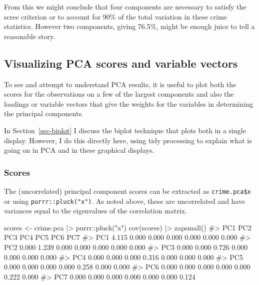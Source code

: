 \documentclass[
  letterpaper,
  10pt,
  krantz2]{krantz}
\makeatletter
\newenvironment{Shaded}{\begin{snugshade}}{\end{snugshade}}
\newcommand{\CommentTok}[1]{\textcolor[rgb]{0.37,0.37,0.37}{#1}}
\newcommand{\FunctionTok}[1]{\textcolor[rgb]{0.28,0.35,0.67}{#1}}
\newcommand{\NormalTok}[1]{\textcolor[rgb]{0.00,0.23,0.31}{#1}}
\newcommand{\OtherTok}[1]{\textcolor[rgb]{0.00,0.23,0.31}{#1}}
\newcommand{\SpecialCharTok}[1]{\textcolor[rgb]{0.37,0.37,0.37}{#1}}
\newcommand{\StringTok}[1]{\textcolor[rgb]{0.13,0.47,0.30}{#1}}
\newenvironment{kframe}{%
  \medskip{}
  \setlength{\fboxsep}{.8em}
  \def\at@end@of@kframe{}%
  \ifinner\ifhmode%
  \def\at@end@of@kframe{\end{minipage}}%
  \begin{minipage}{\columnwidth}%
  \fi\fi%
  \def\FrameCommand##1{\hskip\@totalleftmargin \hskip-\fboxsep
  \colorbox{shadecolor}{##1}\hskip-\fboxsep
      \hskip-\linewidth \hskip-\@totalleftmargin \hskip\columnwidth}%
  \MakeFramed {\advance\hsize-\width
    \@totalleftmargin\z@ \linewidth\hsize
    \@setminipage}}%
{\par\unskip\endMakeFramed%
  \at@end@of@kframe}
\renewenvironment{Shaded}{\begin{kframe}}{\end{kframe}}
\makeatother
\begin{document}
From this we might conclude that four components are necessary to
satisfy the scree criterion or to account for 90\% of the total
variation in these crime statistics. However two components, giving
76.5\%, might be enough juice to tell a reasonable story.

\subsection{Visualizing PCA scores and variable
vectors}\label{visualizing-pca-scores-and-variable-vectors}

To see and attempt to understand PCA results, it is useful to plot both
the scores for the observations on a few of the largest components and
also the loadings or variable vectors that give the weights for the
variables in determining the principal components.

In Section~\ref{sec-biplot} I discuss the biplot technique that plots
both in a single display. However, I do this directly here, using tidy
processing to explain what is going on in PCA and in these graphical
displays.

\subsubsection*{Scores}\label{scores}

The (uncorrelated) principal component scores can be extracted as
\texttt{crime.pca\$x} or using \texttt{purrr::pluck("x")}. As noted
above, these are uncorrelated and have variances equal to the
eigenvalues of the correlation matrix.

\begin{Shaded}
\begin{Highlighting}[]
\NormalTok{scores }\OtherTok{\textless{}{-}}\NormalTok{ crime.pca }\SpecialCharTok{|\textgreater{}}\NormalTok{ purrr}\SpecialCharTok{::}\FunctionTok{pluck}\NormalTok{(}\StringTok{"x"}\NormalTok{) }
\FunctionTok{cov}\NormalTok{(scores) }\SpecialCharTok{|\textgreater{}} \FunctionTok{zapsmall}\NormalTok{()}
\CommentTok{\#\textgreater{}       PC1   PC2   PC3   PC4   PC5   PC6   PC7}
\CommentTok{\#\textgreater{} PC1 4.115 0.000 0.000 0.000 0.000 0.000 0.000}
\CommentTok{\#\textgreater{} PC2 0.000 1.239 0.000 0.000 0.000 0.000 0.000}
\CommentTok{\#\textgreater{} PC3 0.000 0.000 0.726 0.000 0.000 0.000 0.000}
\CommentTok{\#\textgreater{} PC4 0.000 0.000 0.000 0.316 0.000 0.000 0.000}
\CommentTok{\#\textgreater{} PC5 0.000 0.000 0.000 0.000 0.258 0.000 0.000}
\CommentTok{\#\textgreater{} PC6 0.000 0.000 0.000 0.000 0.000 0.222 0.000}
\CommentTok{\#\textgreater{} PC7 0.000 0.000 0.000 0.000 0.000 0.000 0.124}
\end{Highlighting}
\end{Shaded}
\end{document}
